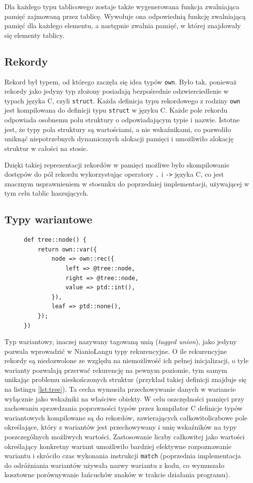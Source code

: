 \documentclass[licencjacka]{pracamgr}
\begin{document}
Dla każdego typu tablicowego zostaje także wygenerowana funkcja zwalniająca pamięć zajmowaną
przez tablicę. Wywołuje ona odpowiednią funkcję zwalniającą pamięć dla każdego elementu,
a następnie zwalnia pamięć, w której znajdowały się elementy tablicy.
\subsection{Rekordy}
Rekord był typem, od którego zaczęła się idea typów \texttt{own}. Było tak, ponieważ rekordy jako jedyny
typ złożony posiadają bezpośrednie odzwierciedlenie w typach języka C, czyli \texttt{struct}.
Każda definicja typu rekordowego z rodziny \texttt{own} jest kompilowana do definicji typu \texttt{struct}
w języku C. Każde pole rekordu odpowiada osobnemu polu struktury o odpowiadającym typie i nazwie.
Istotne jest, że typy pola struktury są wartościami, a nie wskaźnikami, co pozwoliło uniknąć niepotrzebnych
dynamicznych alokacji pamięci i umożliwiło alokację struktur w całości na stosie.

Dzięki takiej reprezentacji rekordów w pamięci możliwe było skompilowanie dostępów do pól rekordu wykorzystując
operatory \texttt{.} i \texttt{->} języka C, co jest znacznym usprawnieniem w stosunku do poprzedniej implementacji,
używającej w tym celu tablic haszujących.
\subsection{Typy wariantowe}
\begin{figure}
\begin{lstlisting}[caption={Rekurencyjna definicja struktury drzewiastej},label={lst:tree},aboveskip=-15pt]
def tree::node() {
    return own::var({
        node => own::rec({
            left => @tree::node,
            right => @tree::node,
            value => ptd::int(),
		}),
        leaf => ptd::none(),
	});
})
\end{lstlisting}
\end{figure}
Typ wariantowy, inaczej nazywany tagowaną unią (\textit{tagged union}), jako jedyny pozwala wprowadzić
w NianioLangu typy rekurencyjne. O ile rekurencyjne rekordy są niedozwolone ze względu na niemożliwość ich
pełnej inicjalizacji, o tyle warianty pozwalają przerwać rekurencję na pewnym poziomie, tym samym unikając
problemu nieskończonych struktur (przykład takiej definicji znajduje się na listingu \ref{lst:tree}).
Ta cecha wymusiła przechowywanie danych w wariancie wyłącznie jako wskaźniki na właściwe obiekty.
W celu oszczędności pamięci przy zachowaniu sprawdzania poprawności typów przez kompilator C definicje typów
wariantowych kompilowane są do rekordów, zawierających całkowitoliczbowe pole określające, który z wariantów
jest przechowywany i unię wskaźników na typy poszczególnych możliwych wartości.
Zastosowanie liczby całkowitej jako wartości określający konkretny wariant umożliwiło bardziej efektywne
rozpoznawanie wariantu i skróciło czas wykonania instrukcji \texttt{match} (poprzednia implementacja do
odróżniania wariantów używała nazwy wariantu z kodu, co wymuszało kosztowne porównywanie łańcuchów znaków
w trakcie działania programu).
\end{document}
